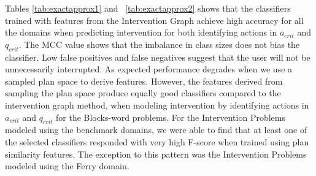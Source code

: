 Tables \ref{tab:exactapprox1} and ~\ref{tab:exactapprox2} shows that the classifiers trained with features from the Intervention Graph achieve high accuracy for all the domains when predicting intervention for both identifying actions in $a_{crit}$ and $q_{crit}$. 
The MCC value shows that the imbalance in class sizes does not bias the classifier. 
Low false positives and false negatives suggest that the user will not be unnecessarily interrupted. 
As expected performance degrades when we use a sampled plan space to derive features.
However, the features derived from sampling the plan space produce equally good classifiers compared to the intervention graph method, when  modeling intervention by identifying actions in $a_{crit}$ and $q_{crit}$  for the Blocks-word problems.
For the Intervention Problems modeled using the benchmark domains, we were able to find that at least one of the selected classifiers responded with very high F-score when trained using plan similarity features. 
The exception to this pattern was the Intervention Problems modeled using the Ferry domain.


